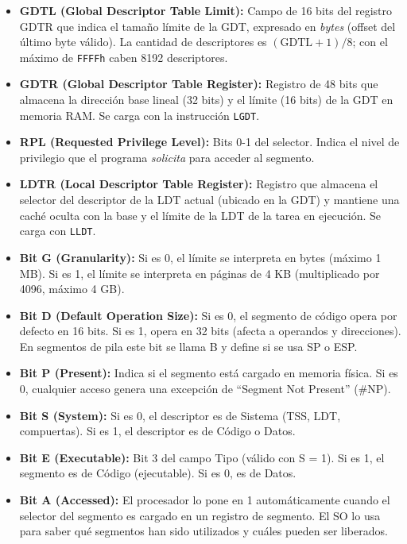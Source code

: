 \documentclass[RT]{UTNLSE}
\begin{document}
\begin{itemize}
    \item \textbf{GDTL (Global Descriptor Table Limit):} Campo de 16 bits del registro GDTR que indica el tamaño límite de la GDT, expresado en \emph{bytes} (offset del último byte válido). La cantidad de descriptores es \((\mathrm{GDTL}+1)/8\); con el máximo de \texttt{FFFFh} caben 8192 descriptores.
    \item \textbf{GDTR (Global Descriptor Table Register):} Registro de 48 bits que almacena la dirección base lineal (32 bits) y el límite (16 bits) de la GDT en memoria RAM. Se carga con la instrucción \texttt{LGDT}.
    \item \textbf{RPL (Requested Privilege Level):} Bits 0-1 del selector. Indica el nivel de privilegio que el programa \textit{solicita} para acceder al segmento.
    \item \textbf{LDTR (Local Descriptor Table Register):} Registro que almacena el selector del descriptor de la LDT actual (ubicado en la GDT) y mantiene una caché oculta con la base y el límite de la LDT de la tarea en ejecución. Se carga con \texttt{LLDT}.
    \item \textbf{Bit G (Granularity):} Si es 0, el límite se interpreta en bytes (máximo 1 MB). Si es 1, el límite se interpreta en páginas de 4 KB (multiplicado por 4096, máximo 4 GB).
    \item \textbf{Bit D (Default Operation Size):} Si es 0, el segmento de código opera por defecto en 16 bits. Si es 1, opera en 32 bits (afecta a operandos y direcciones). En segmentos de pila este bit se llama B y define si se usa SP o ESP.
    \item \textbf{Bit P (Present):} Indica si el segmento está cargado en memoria física. Si es 0, cualquier acceso genera una excepción de ``Segment Not Present'' (\#NP).
    \item \textbf{Bit S (System):} Si es 0, el descriptor es de Sistema (TSS, LDT, compuertas). Si es 1, el descriptor es de Código o Datos.
    \item \textbf{Bit E (Executable):} Bit 3 del campo Tipo (válido con S = 1). Si es 1, el segmento es de Código (ejecutable). Si es 0, es de Datos.
    \item \textbf{Bit A (Accessed):} El procesador lo pone en 1 automáticamente cuando el selector del segmento es cargado en un registro de segmento. El SO lo usa para saber qué segmentos han sido utilizados y cuáles pueden ser liberados.
\end{itemize}
\end{document}
